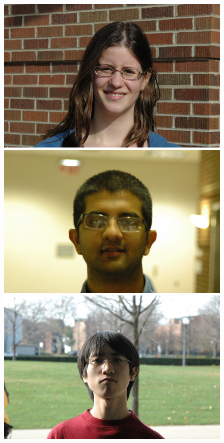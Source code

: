 \begin{figure}
\includegraphics[scale=0.35,clip=true]{figures_cvpr/examples/2/DSC_1585.jpg} 
\includegraphics[scale=0.35,clip=true]{figures_cvpr/examples/2/DSC_1588.jpg} 
\includegraphics[scale=0.35,clip=true]{figures_cvpr/examples/2/DSC_1666.jpg} 

\end{figure}
